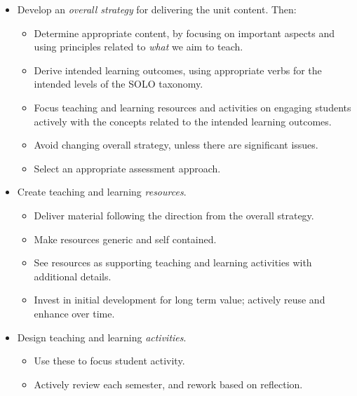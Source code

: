 %
%
%
%


\begin{itemize}[noitemsep,nolistsep]
	\item Develop an \emph{overall strategy} for delivering the unit content. Then:
	\begin{itemize}[noitemsep,nolistsep]
		\item Determine appropriate content, by focusing on important aspects and using principles related to \emph{what} we aim to teach.
		\item Derive intended learning outcomes, using appropriate verbs for the intended levels of the SOLO taxonomy.
		\item Focus teaching and learning resources and activities on engaging students actively with the concepts related to the intended learning outcomes.
		\item Avoid changing overall strategy, unless there are significant issues.
		\item Select an appropriate assessment approach.
	\end{itemize}

	\item Create teaching and learning \emph{resources}.
	\begin{itemize}[noitemsep,nolistsep]
		\item Deliver material following the direction from the overall strategy.
		\item Make resources generic and self contained.
		\item See resources as supporting teaching and learning activities with additional details.
		\item Invest in initial development for long term value; actively reuse and enhance over time.
	\end{itemize}

	\item Design teaching and learning \emph{activities}.
	\begin{itemize}[noitemsep,nolistsep]
		\item Use these to focus student activity.
		\item Actively review each semester, and rework based on reflection.
	\end{itemize}
\end{itemize} 

